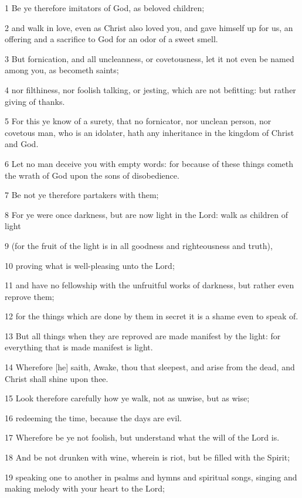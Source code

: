 \par 1 Be ye therefore imitators of God, as beloved children;
\par 2 and walk in love, even as Christ also loved you, and gave himself up for us, an offering and a sacrifice to God for an odor of a sweet smell.
\par 3 But fornication, and all uncleanness, or covetousness, let it not even be named among you, as becometh saints;
\par 4 nor filthiness, nor foolish talking, or jesting, which are not befitting: but rather giving of thanks.
\par 5 For this ye know of a surety, that no fornicator, nor unclean person, nor covetous man, who is an idolater, hath any inheritance in the kingdom of Christ and God.
\par 6 Let no man deceive you with empty words: for because of these things cometh the wrath of God upon the sons of disobedience.
\par 7 Be not ye therefore partakers with them;
\par 8 For ye were once darkness, but are now light in the Lord: walk as children of light
\par 9 (for the fruit of the light is in all goodness and righteousness and truth),
\par 10 proving what is well-pleasing unto the Lord;
\par 11 and have no fellowship with the unfruitful works of darkness, but rather even reprove them;
\par 12 for the things which are done by them in secret it is a shame even to speak of.
\par 13 But all things when they are reproved are made manifest by the light: for everything that is made manifest is light.
\par 14 Wherefore [he] saith, Awake, thou that sleepest, and arise from the dead, and Christ shall shine upon thee.
\par 15 Look therefore carefully how ye walk, not as unwise, but as wise;
\par 16 redeeming the time, because the days are evil.
\par 17 Wherefore be ye not foolish, but understand what the will of the Lord is.
\par 18 And be not drunken with wine, wherein is riot, but be filled with the Spirit;
\par 19 speaking one to another in psalms and hymns and spiritual songs, singing and making melody with your heart to the Lord;
